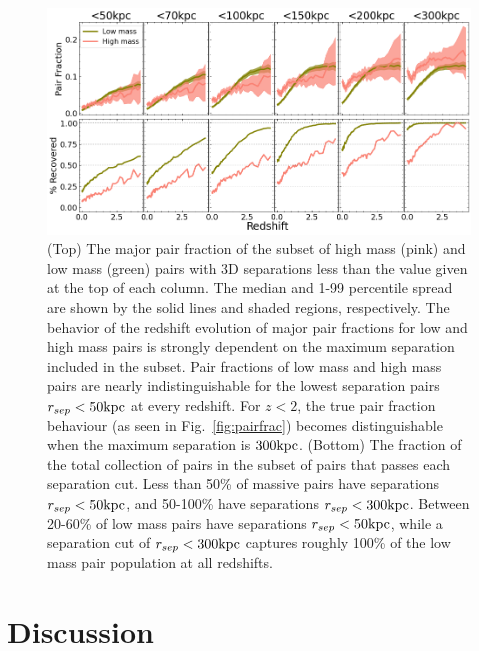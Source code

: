 \documentclass[twocolumn]{aastex631}
\begin{document}
    \begin{figure}[htp]
        \centering
        \includegraphics[width=\textwidth]{pairfrac_sepcut.png}
        \caption{      %
        (Top) The major pair fraction of the subset of high mass (pink) and low mass (green) pairs with 3D separations less than the value given at the top of each column. 
        The median and 1-99 percentile spread are shown by the solid lines and shaded regions, respectively. 
        The behavior of the redshift evolution of major pair fractions for low and high mass pairs is strongly dependent on the maximum separation included in the subset.
        Pair fractions of low mass and high mass pairs are nearly indistinguishable for the lowest separation pairs $r_{sep}<50\mathrm{kpc}$ at every redshift. 
        For $z<2$, the true pair fraction behaviour (as seen in Fig.~\ref{fig:pairfrac}) becomes distinguishable when the maximum separation is $300\mathrm{kpc}$.
        (Bottom) The fraction of the total collection of pairs in the subset of pairs that passes each separation cut.
        Less than 50\% of massive pairs have separations $r_{sep}<50\mathrm{kpc}$, and 50-100\% have separations $r_{sep}<300\mathrm{kpc}$. 
        Between 20-60\% of low mass pairs have separations $r_{sep}<50\mathrm{kpc}$, while a separation cut of $r_{sep}<300\mathrm{kpc}$ captures roughly 100\% of the low mass pair population at all redshifts. 
        }
      \label{fig:sepcut}
    \end{figure}


\section{Discussion}\label{sec:discussion}
\end{document}
